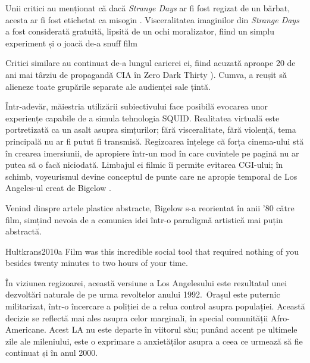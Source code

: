 \documentclass[12pt]{article}
\begin{document}
	Unii critici au menționat că dacă \textit{Strange Days} ar fi fost regizat de un bărbat, acesta ar fi fost etichetat ca misogin \parencite{MirasolBigelowUncanny2010}. Visceralitatea imaginilor din \textit{Strange Days} a fost considerată gratuită, lipsită de un ochi moralizator, fiind un simplu experiment și o joacă de-a snuff film \parencite{Guthmann1995a,DenbyPeopleStrange1995} 
	
	Critici similare au continuat de-a lungul carierei ei, fiind acuzată aproape 20 de ani mai târziu de propagandă CIA în Zero Dark Thirty \parencite{Vishnevetsky2012a}). Cumva, a reușit să alieneze toate grupările separate ale audienței sale țintă.\par
	
	Într-adevăr, măiestria utilizării subiectivului face posibilă evocarea unor experiențe capabile de a simula tehnologia \dedouble SQUID\sqtworight. Realitatea virtuală este portretizată ca un asalt asupra simțurilor; fără visceralitate, fără violență, tema principală nu ar fi putut fi transmisă. Regizoarea înțelege că forța cinema-ului stă în crearea imersiunii, de apropiere într-un mod în care cuvintele pe pagină nu ar putea să o facă niciodată. Limbajul ei filmic îi permite evitarea CGI-ului; în schimb, voyeurismul devine conceptul de punte care ne apropie temporal de Los Angeles-ul creat de Bigelow \parencite{Hultkrans2010a}.\par 
	
	Venind dinspre artele plastice abstracte, Bigelow s-a reorientat în anii '80 către film, simțind nevoia de a comunica idei într-o paradigmă artistică mai puțin abstractă.\par
	
	\begin{displaycquote}{Hultkrans2010a}
		Film was this incredible social tool that required nothing of you besides twenty minutes to two hours of your time.
	\end{displaycquote}
	
	În viziunea regizoarei, această versiune a Los Angelesului este rezultatul unei dezvoltări naturale de pe urma revoltelor anului 1992. Orașul este puternic militarizat, într-o încercare a poliției de a relua control asupra populației. Această decizie se reflectă mai ales asupra celor marginali, în special comunității Afro-Americane. Acest LA nu este departe în viitorul său; punând accent pe ultimele zile ale mileniului, este o exprimare a anxietăților asupra a ceea ce urmează să fie continuat și în anul 2000.\par
	
\end{document}
